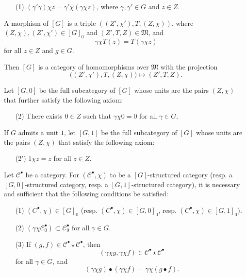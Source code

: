 \documentclass[a4paper,fleqn]{article}
\theoremstyle{plain}
\newenvironment{proposition}[1]
  {\renewcommand\theinnerproposition{#1}\innerproposition}
  {\endinnerproposition}
\theoremstyle{definition}
\newcommand{\CC}{\mathcal{C}}
\newcommand{\MM}{\mathfrak{M}}
\begin{document}
\begin{enumerate}
  \item[\normalfont(1)]
    $(\gamma'\gamma)\chi z=\gamma'\chi(\gamma\chi z)$, where $\gamma,\gamma'\in G$ and $z\in Z$.
\end{enumerate}

A morphism of $[G]$ is a triple $((Z',\chi'),T,(Z,\chi))$, where $(Z,\chi),(Z',\chi')\in[G]_0$ and $(Z',T,Z)\in\MM$, and
\[
  \gamma\chi T(z)
  = T(\gamma\chi z)
\]
for all $z\in Z$ and $g\in G$.

Then $[G]$ is a category of homomorphisms over $\MM$ with the projection
\[
  \big(
    (Z',\chi'), T, (Z,\chi)
  \big)
  \longmapsto (Z',T,Z).
\]

Let $[G,0]$ be the full subcategory of $[G]$ whose units are the pairs $(Z,\chi)$ that further satisfy the following axiom:

\begin{enumerate}
  \item[\normalfont(2)]
    There exists $0\in Z$ such that $\gamma\chi0=0$ for all $\gamma\in G$.
\end{enumerate}

If $G$ admits a unit $1$, let $[G,1]$ be the full subcategory of $[G]$ whose units are the pairs $(Z,\chi)$ that satisfy the following axiom:

\begin{enumerate}
  \item[\normalfont(2')]
    $1\chi z=z$ for all $z\in Z$.
\end{enumerate}

\begin{proposition}{3}
\label{proposition:ii-3}
  Let $\CC^\bullet$ be a category.
  For $(\CC^\bullet,\chi)$ to be a $[G]$-structured category (resp. a $[G,0]$-structured category, resp. a $[G,1]$-structured category), it is necessary and sufficient that the following conditions be satisfied:

  \begin{enumerate}
    \item[\normalfont(1)]
      $(C^\bullet,\chi)\in[G]_0$ (resp. $(C^\bullet,\chi)\in[G,0]_0$, resp. $(C^\bullet,\chi)\in[G,1]_0$).
    \item[\normalfont(2)]
      $(\gamma\chi\CC_0^\bullet)\subset\CC_0^\bullet$ for all $\gamma\in G$.
    \item[\normalfont(3)]
      If $(g,f)\in\CC^\bullet\star\CC^\bullet$, then
      \[
        (\gamma\chi g,\gamma\chi f)
        \in\CC^\bullet\star\CC^\bullet
      \]
      for all $\gamma\in G$, and
      \[
        (\gamma\chi g)\bullet(\gamma\chi f)
        = \gamma\chi(g\bullet f).
      \]
  \end{enumerate}
\end{proposition}
\end{document}
